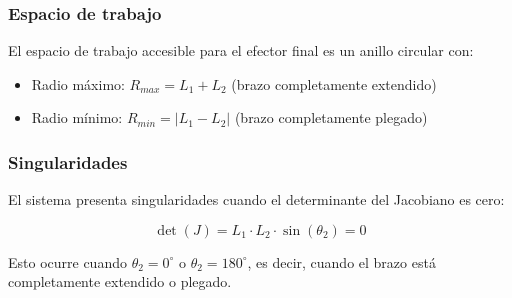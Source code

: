 \subsubsection{Espacio de trabajo}

El espacio de trabajo accesible para el efector final es un anillo circular con:

\begin{itemize}
    \item Radio máximo: $R_{max} = L_1 + L_2$ (brazo completamente extendido)
    \item Radio mínimo: $R_{min} = |L_1 - L_2|$ (brazo completamente plegado)
\end{itemize}





\subsubsection{Singularidades}

El sistema presenta singularidades cuando el determinante del Jacobiano es cero:

\begin{equation}
    \det(J) = L_1 \cdot L_2 \cdot \sin(\theta_2) = 0
\end{equation}

Esto ocurre cuando \(\theta_2 = 0^\circ \) o \(\theta_2 = 180^\circ\), es decir, cuando el brazo está completamente extendido o plegado.

